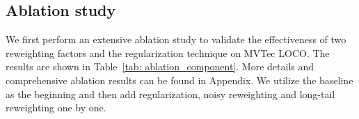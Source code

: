 \documentclass[letterpaper]{article} %
\begin{document}

\subsection{Ablation study}

We first perform an extensive ablation study to validate the effectiveness of two reweighting factors and the regularization technique on MVTec LOCO. The results are shown in Table~\ref{tab: ablation_component}. More details and comprehensive ablation results can be found in Appendix. We utilize the baseline as the beginning and then add regularization, noisy reweighting and long-tail reweighting one by one. 
\end{document}

